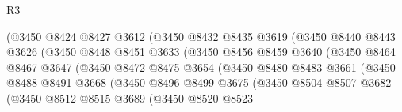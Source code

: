\begin{lexlean}{R3}
\begin{coremodule}
                                (@3450
                                  @8424
                                  @8427
                                  @3612
                                  (@3450
                                    @8432
                                    @8435
                                    @3619
                                    (@3450
                                      @8440
                                      @8443
                                      @3626
                                      (@3450
                                        @8448
                                        @8451
                                        @3633
                                        (@3450
                                          @8456
                                          @8459
                                          @3640
                                          (@3450
                                            @8464
                                            @8467
                                            @3647
                                            (@3450
                                              @8472
                                              @8475
                                              @3654
                                              (@3450
                                                @8480
                                                @8483
                                                @3661
                                                (@3450
                                                  @8488
                                                  @8491
                                                  @3668
                                                  (@3450
                                                    @8496
                                                    @8499
                                                    @3675
                                                    (@3450
                                                      @8504
                                                      @8507
                                                      @3682
                                                      (@3450
                                                        @8512
                                                        @8515
                                                        @3689
                                                        (@3450
                                                          @8520
                                                          @8523

\end{coremodule}
\end{lexlean}
